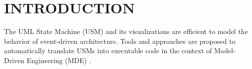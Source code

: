 \section{\uppercase{Introduction}}
\label{sec:intro}

The UML State Machine (USM) \cite{Specification2007} and its visualizations are efficient to model the behavior of event-driven architecture.   
Tools and approaches are proposed to automatically translate USMs into executable code in the context of Model-Driven Engineering (MDE) \cite{Mussbacher2014}.%

